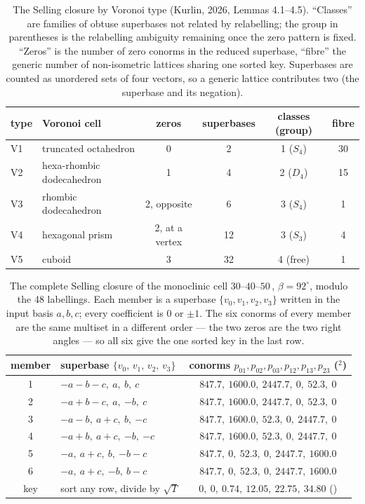 \documentclass[preprint,pdf]{iucr}          %
\newcommand{\Ang}{\text{\AA}}
\begin{document}
\begin{table}
\caption{The Selling closure by Voronoi type (Kurlin, 2026, Lemmas 4.1--4.5). ``Classes'' are families of obtuse superbases not related by relabelling; the group in parentheses is the relabelling ambiguity remaining once the zero pattern is fixed. ``Zeros'' is the number of zero conorms in the reduced superbase, ``fibre'' the generic number of non-isometric lattices sharing one sorted key. Superbases are counted as unordered sets of four vectors, so a generic lattice contributes two (the superbase and its negation).}
\label{tab:closure}
\begin{footnotesize}\begin{tabular}{llcccc}
type & Voronoi cell & zeros & superbases & classes (group) & fibre \\
\hline
V1 & truncated octahedron & 0 & 2 & 1 ($S_4$) & 30 \\
V2 & hexa-rhombic dodecahedron & 1 & 4 & 2 ($D_4$) & 15 \\
V3 & rhombic dodecahedron & 2, opposite & 6 & 3 ($S_4$) & 1 \\
V4 & hexagonal prism & 2, at a vertex & 12 & 3 ($S_3$) & 4 \\
V5 & cuboid & 3 & 32 & 4 (free) & 1 \\
\end{tabular}\end{footnotesize}
\end{table}

\begin{table}
\caption{The complete Selling closure of the monoclinic cell $30$--$40$--$50$\,\Ang, $\beta=92^\circ$, modulo the 48 labellings. Each member is a superbase $\{v_0,v_1,v_2,v_3\}$ written in the input basis $a,b,c$; every coefficient is $0$ or $\pm1$. The six conorms of every member are the same multiset in a different order --- the two zeros are the two right angles --- so all six give the one sorted key in the last row.}
\label{tab:example}
\begin{footnotesize}\begin{tabular}{clc}
member & superbase $\{v_0,\,v_1,\,v_2,\,v_3\}$ & conorms $p_{01},p_{02},p_{03},p_{12},p_{13},p_{23}$ (\Ang$^2$) \\
\hline
1 & $-a{-}b{-}c,\ a,\ b,\ c$ & $847.7,\ 1600.0,\ 2447.7,\ 0,\ 52.3,\ 0$ \\
2 & $-a{+}b{-}c,\ a,\ {-b},\ c$ & $847.7,\ 1600.0,\ 2447.7,\ 0,\ 52.3,\ 0$ \\
3 & $-a{-}b,\ a{+}c,\ b,\ {-c}$ & $847.7,\ 1600.0,\ 52.3,\ 0,\ 2447.7,\ 0$ \\
4 & $-a{+}b,\ a{+}c,\ {-b},\ {-c}$ & $847.7,\ 1600.0,\ 52.3,\ 0,\ 2447.7,\ 0$ \\
5 & $-a,\ a{+}c,\ b,\ {-b}{-}c$ & $847.7,\ 0,\ 52.3,\ 0,\ 2447.7,\ 1600.0$ \\
6 & $-a,\ a{+}c,\ {-b},\ b{-}c$ & $847.7,\ 0,\ 52.3,\ 0,\ 2447.7,\ 1600.0$ \\
\hline
key & sort any row, divide by $\sqrt{T}$ & $0,\ 0,\ 0.74,\ 12.05,\ 22.75,\ 34.80$ (\Ang) \\
\end{tabular}\end{footnotesize}
\end{table}
\end{document}
